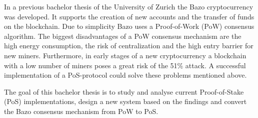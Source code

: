 
In a previous bachelor thesis of the University of Zurich the Bazo cryptocurrency was developed. It supports the creation of new accounts and the transfer of funds on the blockchain. Due to simplicity Bazo uses a Proof-of-Work (PoW) consensus algorithm. The biggest disadvantages of a PoW consensus mechanism are the high energy consumption, the risk of centralization and the high entry barrier for new miners. Furthermore, in early stages of a new cryptocurrency a blockchain with a low number of miners poses a great risk of the 51\% attack. A successful implementation of a PoS-protocol could solve these problems mentioned above.

The goal of this bachelor thesis is to study and analyse current Proof-of-Stake (PoS) implementations, design a new system based on the findings and convert the Bazo consensus mechanism from PoW to PoS.
